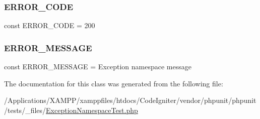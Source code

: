 \subsubsection{\texorpdfstring{E\+R\+R\+O\+R\+\_\+\+C\+O\+DE}{ERROR\_CODE}}
{\footnotesize\ttfamily const E\+R\+R\+O\+R\+\_\+\+C\+O\+DE = 200}

\mbox{\label{class_my_1_1_space_1_1_exception_namespace_test_a7ee5ba193850ba436589d042e5b1d782}} 
\subsubsection{\texorpdfstring{E\+R\+R\+O\+R\+\_\+\+M\+E\+S\+S\+A\+GE}{ERROR\_MESSAGE}}
{\footnotesize\ttfamily const E\+R\+R\+O\+R\+\_\+\+M\+E\+S\+S\+A\+GE = \textquotesingle{}Exception namespace message\textquotesingle{}}



The documentation for this class was generated from the following file\+:\begin{DoxyCompactItemize}
\item 
/\+Applications/\+X\+A\+M\+P\+P/xamppfiles/htdocs/\+Code\+Igniter/vendor/phpunit/phpunit/tests/\+\_\+files/\mbox{\hyperlink{_exception_namespace_test_8php}{Exception\+Namespace\+Test.\+php}}\end{DoxyCompactItemize}
